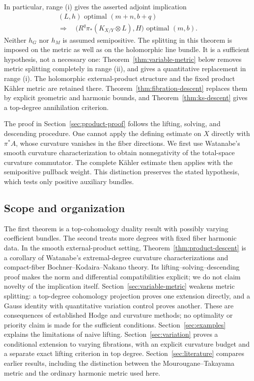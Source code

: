 \documentclass[11pt,reqno]{amsart}
\numberwithin{equation}{section}
\theoremstyle{definition}
\theoremstyle{remark}
\begin{document}
In particular, range (i) gives the asserted adjoint implication
\begin{equation}\label{eq:adjoint-specialization}
 \begin{gathered}
 (L,h)\text{ optimal }(m+n,b+q)\\
 \Longrightarrow\quad
 \bigl(R^q\pi_*(K_{X/Y}\otimes L),H\bigr)
       \text{ optimal }(m,b).
 \end{gathered}
\end{equation}
Neither $h_G$ nor $h_M$ is assumed semipositive. The splitting in this theorem is imposed on the metric as well as on the holomorphic line bundle. It is a sufficient hypothesis, not a necessary one: Theorem~\ref{thm:variable-metric} below removes metric splitting completely in range (ii), and gives a quantitative replacement in range (i). The holomorphic external-product structure and the fixed product K\"ahler metric are retained there. Theorem~\ref{thm:fibration-descent} replaces them by explicit geometric and harmonic bounds, and Theorem~\ref{thm:ks-descent} gives a top-degree annihilation criterion.

The proof in Section~\ref{sec:product-proof} follows the lifting, solving, and descending procedure. One cannot apply the defining estimate on $X$ directly with $\pi^*A$, whose curvature vanishes in the fiber directions. We first use Watanabe's smooth curvature characterization \cite{Wat21} to obtain nonnegativity of the total-space curvature commutator. The complete K\"ahler estimate then applies with the semipositive pullback weight. This distinction preserves the stated hypothesis, which tests only positive auxiliary bundles.

\subsection{Scope and organization}
The first theorem is a top-cohomology duality result with possibly varying coefficient bundles. The second treats more degrees with fixed fiber harmonic data. In the smooth external-product setting, Theorem~\ref{thm:product-descent} is a corollary of Watanabe's extremal-degree curvature characterizations and compact-fiber Bochner--Kodaira--Nakano theory. Its lifting--solving--descending proof makes the norm and differential compatibilities explicit; we do not claim novelty of the implication itself. Section~\ref{sec:variable-metric} weakens metric splitting: a top-degree cohomology projection proves one extension directly, and a Gauss identity with quantitative variation control proves another. These are consequences of established Hodge and curvature methods; no optimality or priority claim is made for the sufficient conditions. Section~\ref{sec:examples} explains the limitations of naive lifting. Section~\ref{sec:variation} proves a conditional extension to varying fibrations, with an explicit curvature budget and a separate exact lifting criterion in top degree. Section~\ref{sec:literature} compares earlier results, including the distinction between the Mourougane--Takayama metric and the ordinary harmonic metric used here.
\end{document}
